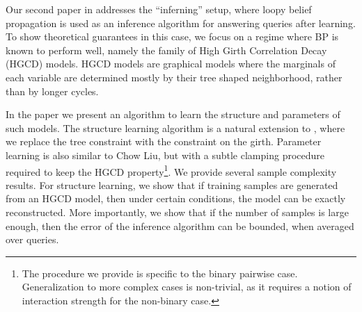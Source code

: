 
Our second paper in  addresses the ``inferning'' setup, where loopy belief propagation is used as an inference algorithm for answering queries after learning.  
To show theoretical guarantees in this case, we focus on a regime where BP is known to perform well, 
namely the family of High Girth Correlation Decay (HGCD) models. HGCD models are graphical models where the marginals of each variable are determined mostly by their tree shaped neighborhood, rather than  by longer cycles. 

In the paper we present an algorithm to learn the structure and parameters of such models.
The structure learning algorithm is a natural extension to \cite{chowLiu}, where we replace the tree constraint with the constraint on the girth.
Parameter learning is also similar to Chow Liu, but with a subtle clamping procedure required to keep the HGCD property\footnote{The procedure we provide is specific to the binary pairwise case. Generalization to more complex cases is non-trivial, as it requires a notion of interaction strength for the non-binary case.}.
We provide several sample complexity results. 
For structure learning, we show that if training samples are generated from an HGCD model, then under certain conditions, the model can be exactly reconstructed.
More importantly, we show that if the number of samples is large enough, then the error of the inference algorithm can be bounded, when averaged over queries.

